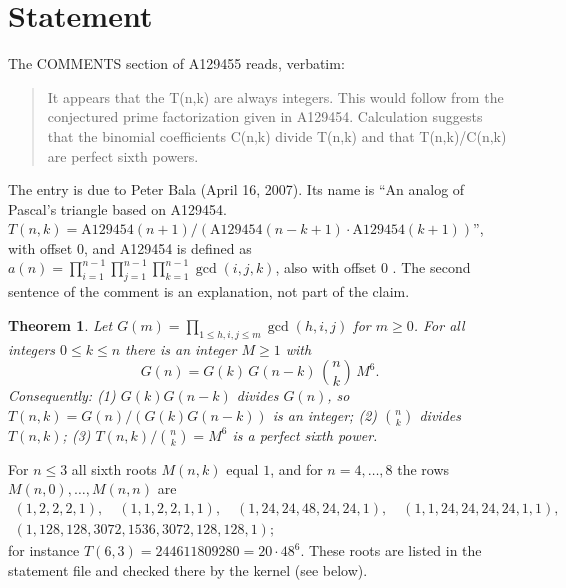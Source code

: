 \documentclass[11pt]{amsart}
\theoremstyle{plain}
\newtheorem{theorem}{Theorem}
\theoremstyle{definition}
\begin{document}
\section{Statement}\label{sec:statement}

The COMMENTS section of A129455 \cite{A129455} reads, verbatim:
\begin{quote}
\small It appears that the T(n,k) are always integers. This would follow from the conjectured prime factorization given in A129454. Calculation suggests that the binomial coefficients C(n,k) divide T(n,k) and that T(n,k)/C(n,k) are perfect sixth powers.
\end{quote}
The entry is due to Peter Bala (April 16, 2007). Its name is ``An analog of Pascal's triangle based on A129454. $T(n, k) = \mathrm{A129454}(n+1)/(\mathrm{A129454}(n-k+1)\cdot\mathrm{A129454}(k+1))$'', with offset $0$, and A129454 is defined as $a(n)=\prod_{i=1}^{n-1}\prod_{j=1}^{n-1}\prod_{k=1}^{n-1}\gcd(i,j,k)$, also with offset $0$ \cite{A129454}. The second sentence of the comment is an explanation, not part of the claim.

\begin{theorem}\label{thm:main}
Let $G(m)=\prod_{1\le h,i,j\le m}\gcd(h,i,j)$ for $m\ge0$. For all integers $0\le k\le n$ there is an integer $M\ge1$ with
\begin{equation}\label{eq:main}\tag{$\ast$}
  G(n)=G(k)\,G(n-k)\,\binom nk\,M^6 .
\end{equation}
Consequently: \textup{(1)} $G(k)G(n-k)$ divides $G(n)$, so $T(n,k)=G(n)/(G(k)G(n-k))$ is an integer; \textup{(2)} $\binom nk$ divides $T(n,k)$; \textup{(3)} $T(n,k)/\binom nk=M^6$ is a perfect sixth power.
\end{theorem}

For $n\le3$ all sixth roots $M(n,k)$ equal $1$, and for $n=4,\dots,8$ the rows $M(n,0),\dots,M(n,n)$ are
\[
\begin{gathered}
(1,2,2,2,1),\quad (1,1,2,2,1,1),\quad (1,24,24,48,24,24,1),\quad (1,1,24,24,24,24,1,1),\\
(1,128,128,3072,1536,3072,128,128,1);
\end{gathered}
\]
for instance $T(6,3)=244611809280=20\cdot48^6$. These roots are listed in the statement file and checked there by the kernel (see below).
\end{document}
